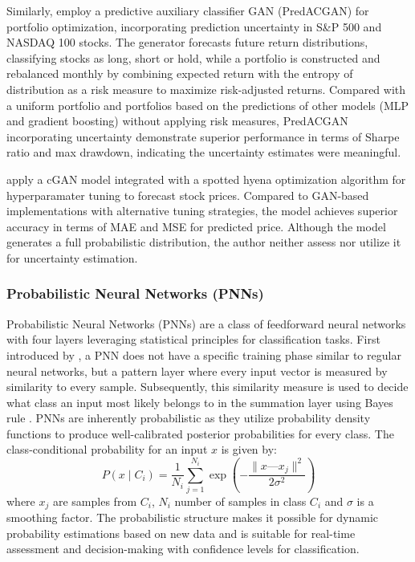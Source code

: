 Similarly, \textcite{kim2023portfolio} employ a predictive auxiliary classifier GAN (PredACGAN) for portfolio optimization, incorporating prediction uncertainty in S\&P 500 and NASDAQ 100 stocks. The generator forecasts future return distributions, classifying stocks as long, short or hold, while a portfolio is constructed and rebalanced monthly by combining expected return with the entropy of distribution as a risk measure to maximize risk-adjusted returns. Compared with a uniform portfolio and portfolios based on the predictions of other models (MLP and gradient boosting) without applying risk measures, PredACGAN incorporating uncertainty demonstrate superior performance in terms of Sharpe ratio and max drawdown, indicating the uncertainty estimates were meaningful. 

\textcite{salama2024gan} apply a cGAN model integrated with a spotted hyena optimization algorithm for hyperparamater tuning to forecast stock prices. Compared to GAN-based implementations with alternative tuning strategies, the model achieves superior accuracy in terms of MAE and MSE for predicted price. Although the model generates a full probabilistic distribution, the author neither assess nor utilize it for uncertainty estimation. 



\subsubsection{Probabilistic Neural Networks (PNNs)}
Probabilistic Neural Networks (PNNs) are a class of feedforward neural networks with four layers leveraging statistical principles for classification tasks. First introduced by \textcite{Specht1990pnn}, a PNN does not have a specific training phase similar to regular neural networks, but a pattern layer where every input vector is measured by similarity to every sample. Subsequently, this similarity measure is used to decide what class an input most likely belongs to in the summation layer using Bayes rule \parencite{Specht1990pnn}. PNNs are inherently probabilistic as they utilize probability density functions to produce well-calibrated posterior probabilities for every class. The class-conditional probability for an input $x$ is given by:
\begin{equation}
P(x \mid C_i) = \frac{1}{N_i} \sum_{j=1}^{N_i} \exp \left( -\frac{\| x—x_j \|^2}{2\sigma^2} \right)
\end{equation}
where $x_j$ are samples from $C_i$, $N_i$ number of samples in class $C_i$ and $\sigma$ is a smoothing factor. 
The probabilistic structure makes it possible for dynamic probability estimations based on new data and is suitable for real-time assessment and decision-making with confidence levels for classification. 

